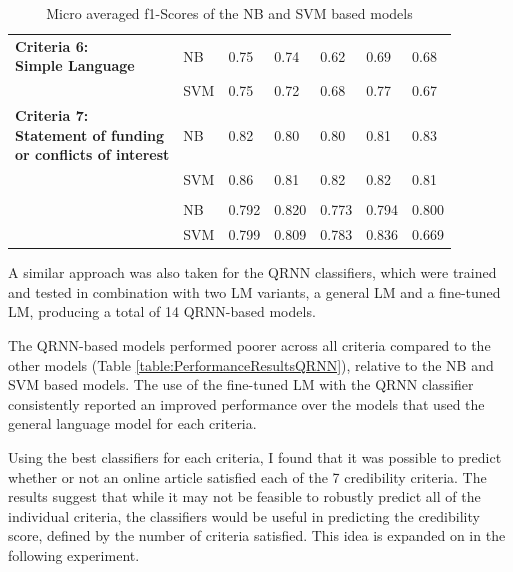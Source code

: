 \documentclass[a4paper,twoside,phd]{BYUPhys}
\begin{document}
\begin{table}[H]
{\begin{tabular}{|p{6cm}|p{2.6cm}|p{2.6cm}|p{2.6cm}|p{2.6cm}|p{2.6cm}|p{2.6cm}|}
			
			\multirowcell{2}{\textbf{Criteria 6:} \\ \textbf{Simple Language}} & NB & 0.75 & 0.74 & 0.62 & 0.69 & 0.68 \\ 
			& SVM & 0.75 & 0.72 & 0.68 & 0.77 & 0.67 \\
			\hline 
			
			
			\multirowcell{3}{\textbf{Criteria 7:} \\ \textbf{Statement of funding} \\ \textbf{or conflicts of interest}} 
			& NB & 0.82 & 0.80 & 0.80 & 0.81 & 0.83 \\ 
			& SVM & 0.86 & 0.81 & 0.82 & 0.82 & 0.81 \\ & & & & & & \\ 
			\hline 
			
			
			\multirowcell{2}{\textbf{Average} \textbf{Performance}} & NB & 0.792 & 0.820 & 0.773 & 0.794 & 0.800      \\ 
			& SVM & 0.799 & 0.809 & 0.783 & 0.836 & 0.669      \\
			\hline                                                                                                                                          
	\end{tabular}}
	\caption{Micro averaged f1-Scores of the NB and SVM based models}
	\label{table:PerformanceResultsNBSVM}
\end{table}

A similar approach was also taken for the QRNN classifiers, which were trained and tested in combination with two LM variants, a general LM and a fine-tuned LM, producing a total of 14 QRNN-based models. \newline

The QRNN-based models performed poorer across all criteria compared to the other models (Table \ref{table:PerformanceResultsQRNN}), relative to the NB and SVM based models. The use of the fine-tuned LM with the QRNN classifier consistently reported an improved performance over the models that used the general language model for each criteria. \newline

Using the best classifiers for each criteria, I found that it was possible to predict whether or not an online article satisfied each of the 7 credibility criteria. The results suggest that while it may not be feasible to robustly predict all of the individual criteria, the classifiers would be useful in predicting the credibility score, defined by the number of criteria satisfied. This idea is expanded on in the following experiment.
\end{document}

